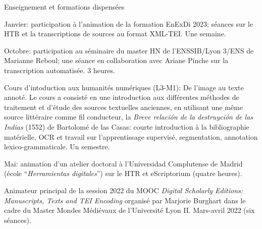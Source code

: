\begin{rubric}{Enseignement et formations dispensées}
                                \entry*[2022-2023]
                                
                            Janvier: participation à l'animation de la formation EnExDi 2023; séances
                        sur le HTR et la transcriptions de sources au format XML-TEI. Une
                        semaine.
                    
                                \entry*
                            Octobre: participation au séminaire du master HN de l'ENSSIB/Lyon 3/ENS de
                        Marianne Reboul; une séance en collaboration avec Ariane Pinche sur la
                        transcription automatisée. 3 heures.
                    
                                \entry*
                            Cours d'intoduction aux humanités numériques (L3-M1): De l'image au texte
                        annoté. Le cours a consisté en une introduction aux différentes méthodes de
                        traitement et d'étude des sources textuelles anciennes, en utilisant une même
                        source littéraire comme fil conducteur, la \textit{Breve relación de la
                            destruyción de las Indias} (1552) de Bartolomé de las Casas: courte
                        introduction à la bibliographie matérielle, OCR et travail sur l'apprentissage
                        supervisé, segmentation, annotation lexico-grammaticale. Un semestre.
                    
                                \entry*[2021-2022]
                                
                            Mai: animation d'un atelier doctoral à l'Universidad Complutense de Madrid
                        (école \enquote{\textit{Herramientas digitales}}) sur le HTR et eScriptorium
                        (quatre heures).
                    
                                \entry*
                            Animateur principal de la session 2022 du MOOC \textit{Digital Scholarly
                            Editions: Manuscripts, Texts and TEI Encoding} organisé par Marjorie
                        Burghart dans le cadre du Master Mondes Médiévaux de l'Université Lyon II.
                        Mars-avril 2022 (six séances).
                    

\end{rubric}
